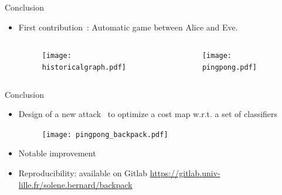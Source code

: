 \documentclass[10pt,aspectratio=169]{beamer}
\begin{document}
\begin{frame}{Conclusion}

    \begin{itemize}
        \item First contribution~: Automatic game between Alice and Eve. 
        
            \begin{columns}[c] 
                \begin{column}{.5\textwidth}
                    \begin{figure}[h]
                        \texttt{[image: historicalgraph.pdf]}
                    \end{figure}
                \end{column}  
                
                \pause
                \begin{column}{.5\textwidth}
                    \begin{figure}[h]
                        \texttt{[image: pingpong.pdf]}
                    \end{figure}
                \end{column}  
            \end{columns}
        
    \end{itemize}
\end{frame}


\begin{frame}{Conclusion}

        \begin{itemize}
            \item Design of a new attack~ to optimize a cost map w.r.t. a set of classifiers
            \pause     
            \begin{figure}[h]
                    \texttt{[image: pingpong\_backpack.pdf]}
                \end{figure}
            \item Notable improvement
            \item Reproducibility: available on Gitlab \url{https://gitlab.univ-lille.fr/solene.bernard/backpack}
        \end{itemize}  

\end{frame}
\end{document}
